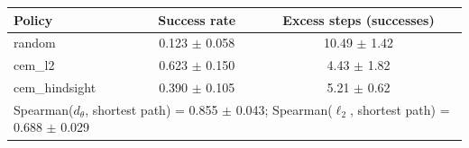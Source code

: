 \begin{tabular}{lcc}
\toprule
Policy & Success rate & Excess steps (successes) \\
\midrule
random & 0.123 $\pm$ 0.058 & 10.49 $\pm$ 1.42 \\
cem\_l2 & 0.623 $\pm$ 0.150 & 4.43 $\pm$ 1.82 \\
cem\_hindsight & 0.390 $\pm$ 0.105 & 5.21 $\pm$ 0.62 \\
\midrule
\multicolumn{3}{l}{Spearman($d_\theta$, shortest path) = 0.855 $\pm$ 0.043; Spearman($\ell_2$, shortest path) = 0.688 $\pm$ 0.029} \\
\bottomrule
\end{tabular}
